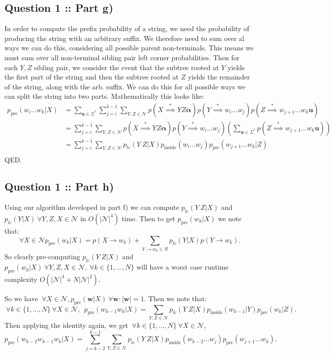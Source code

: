 \documentclass[a4paper]{article}
\begin{document}
\subsection*{Question 1 :: Part g)}
In order to compute the prefix probability of a string, we need the probability
of producing the string with an arbitrary suffix. We therefore need to sum 
over al ways we can do this, considering all possible parent non-terminals. This means
we must sum over all non-terminal sibling pair left corner probabilities. Then for each $Y,Z$ sibling
pair, we consider the event that the subtree rooted at $Y$ yields the first part of the string and then
the subtree rooted at $Z$ yields the remainder of the string, along with the arb. suffix.
We can do this for all possible ways we can split the string into two parts. Mathematically this looks like:
\begin{align*}
     p_{\text{pre}}(w_i...w_k |X) &=  \sum_{\bm{u} \in \Sigma^*} \sum_{j=i}^{k-1} \sum_{Y,Z \in \mathcal{N}} p(X \stackrel{*}{\implies} Y Z \bm{\alpha}) p(Y \stackrel{*}{\implies} w_i ... w_j) p(Z \stackrel{*}{\implies} w_{j+1}...w_k \bm{u})\\ 
    &=  \sum_{j=i}^{k-1} \sum_{Y,Z \in \mathcal{N}} p(X \stackrel{*}{\implies} Y Z \bm{\alpha}) p(Y \stackrel{*}{\implies} w_i ... w_j) \left(  \sum_{\bm{u} \in \Sigma^*}  p(Z \stackrel{*}{\implies} w_{j+1}...w_k \bm{u})\right) \\ 
    &=  \sum_{j=i}^{k-1} \sum_{Y,Z \in \mathcal{N}} p_{lc}(Y~Z | X) p_{\text{inside}}(w_i...w_j) p_{\text{pre}}(w_{j+1}...w_k | Z)\\
\end{align*}
QED.
\subsection*{Question 1 :: Part h)}
Using our algorithm developed in part f) we can compute $p_{lc}(Y~Z|X)$
and $p_{lc}(Y|X) ~\forall Y, Z, X \in \mathcal{N}$ in $O(| \mathcal{N}|^4)$ time.
Then to get $p_{\text{pre}}(w_k | X)$ we note that:
\[
~\forall X \in \mathcal{N} p_{\text{pre}}(w_k | X) = p(X\to w_k) + \sum_{Y \to w_k \in \mathcal{R}} p_{lc}(Y | X) p(Y \to w_k)
.\]
So clearly pre-computing $p_{lc}(Y~Z| X)$ and $p_{\text{pre}}(w_k | X) ~\forall Y, Z, X \in \mathcal{N}, ~\forall k \in \{1,..., N\} $ will have a 
worst case runtime complexity $O(| \mathcal{N} |^4 + N| \mathcal{N}|^2)$.

So we have $~\forall X \in \mathcal{N}, p_{\text{pre}}(\bm{w}|X) ~\forall \bm{w} : \left| \bm{w} \right| =1$.
Then we note that:
\[
~\forall k \in \{1,...,N\} ~\forall X \in \mathcal{N}, ~ ~ p_{\text{pre}}(w_{k-1}w_k | X) = \sum_{Y,Z \in \mathcal{N}} p_{lc}(Y~Z|X) p_{\text{inside}}(w_{k-1}|Y) p_{\text{pre}}(w_k | Z)
.\]
Then applying the identity again, we get $~\forall k \in \{1, ..., N\} ~\forall X \in \mathcal{N}$,
\[
p_{\text{pre}}(w_{k-2} w_{k-1} w_k | X) =
\sum_{j=k-2}^{k-1} \sum_{Y,Z \in \mathcal{N}} p_{lc}(Y~Z|X) p_{\text{inside}}(w_{k-2}...w_j) p_{\text{pre}}(w_{j+1}...w_k)
.\]
\end{document}
